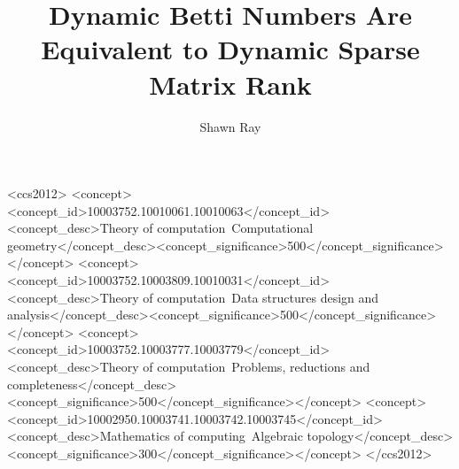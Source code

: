 \documentclass[acmsmall,review,screen]{acmart}
\theoremstyle{acmdefinition}
\begin{document}
\title[Dynamic Betti Numbers and Dynamic Matrix Rank]{Dynamic Betti Numbers Are Equivalent to Dynamic Sparse Matrix Rank}

\author{Shawn Ray}



\begin{CCSXML}
<ccs2012>
<concept><concept_id>10003752.10010061.10010063</concept_id><concept_desc>Theory of computation~Computational geometry</concept_desc><concept_significance>500</concept_significance></concept>
<concept><concept_id>10003752.10003809.10010031</concept_id><concept_desc>Theory of computation~Data structures design and analysis</concept_desc><concept_significance>500</concept_significance></concept>
<concept><concept_id>10003752.10003777.10003779</concept_id><concept_desc>Theory of computation~Problems, reductions and completeness</concept_desc><concept_significance>500</concept_significance></concept>
<concept><concept_id>10002950.10003741.10003742.10003745</concept_id><concept_desc>Mathematics of computing~Algebraic topology</concept_desc><concept_significance>300</concept_significance></concept>
</ccs2012>
\end{CCSXML}


\maketitle









\begin{acks}

\end{acks}



\end{document}
